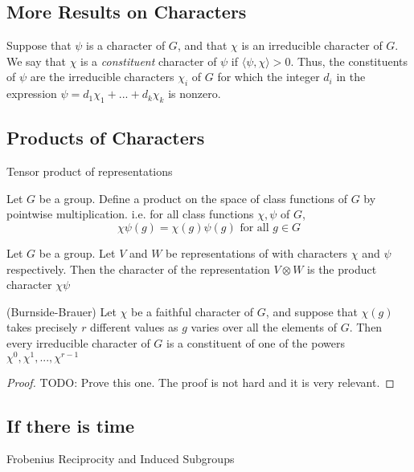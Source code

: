 \subsection{More Results on Characters}


\begin{definition}
    Suppose that $\psi$ is a character of $G$, and that $\chi$ is an irreducible character of $G$. We say that 
    $\chi$ is a \emph{constituent} character of $\psi$ if $\langle \psi, \chi \rangle > 0$. Thus, the constituents 
    of $\psi$ are the irreducible characters $\chi_i$ of $G$ for which the integer $d_i$ in the expression $\psi = 
    d_1\chi_1 + ... + d_k\chi_k$ is nonzero.
\end{definition}





\subsection{Products of Characters}

\begin{definition}
    Tensor product of representations
\end{definition}

\begin{definition}
    Let $G$ be a group. Define a product on the space of class functions of $G$ by pointwise multiplication. i.e.
    for all class functions $\chi, \psi$ of $G$, 
    \[
        \chi\psi(g) = \chi(g)\psi(g) \text{ for all } g \in G
    \]
\end{definition}


\begin{proposition}
    Let $G$ be a group. Let $V$ and $W$ be representations of with characters $\chi$ and $\psi$ respectively. Then 
    the character of the representation $V \otimes W$ is the product character $\chi\psi$
\end{proposition}


\begin{theorem}\label{thm:Burnside_Brauer}(Burnside-Brauer)
    Let $\chi$ be a faithful character of $G$, and suppose that $\chi(g)$ takes precisely $r$ different values as 
    $g$ varies over all the elements of $G$. Then every irreducible character of $G$ is a constituent of one of the 
    powers $\chi^0, \chi^1, ... , \chi^{r-1}$
\end{theorem}

\begin{proof}
    TODO: Prove this one. The proof is not hard and it is very relevant.
\end{proof}




\subsection{If there is time}


Frobenius Reciprocity and Induced Subgroups

